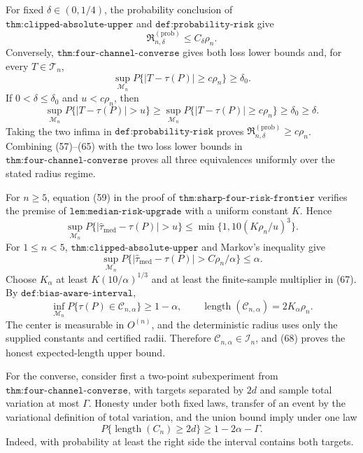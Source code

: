 For fixed \(\delta\in(0,1/4)\), the probability conclusion of \(\texttt{thm:clipped-absolute-upper}\) and \(\texttt{def:probability-risk}\) give
\[
\mathfrak R_{n,\delta}^{(\mathrm{prob})}\leq C_\delta\rho_n.           \tag{63}
\]
Conversely, \(\texttt{thm:four-channel-converse}\) gives both loss lower bounds and, for every \(T\in\mathcal T_n\),
\[
\sup_{\mathcal M_n}P\{|T-\tau(P)|\geq c\rho_n\}\geq\delta_0.         \tag{64}
\]
If \(0<\delta\leq\delta_0\) and \(u<c\rho_n\), then
\[
\sup_{\mathcal M_n}P\{|T-\tau(P)|>u\}
\geq\sup_{\mathcal M_n}P\{|T-\tau(P)|\geq c\rho_n\}
\geq\delta_0\geq\delta.                                                 \tag{65}
\]
Taking the two infima in \(\texttt{def:probability-risk}\) proves \(\mathfrak R_{n,\delta}^{(\mathrm{prob})}\geq c\rho_n\).  Combining (57)--(65) with the two loss lower bounds in \(\texttt{thm:four-channel-converse}\) proves all three equivalences uniformly over the stated radius regime.

For \(n\geq5\), equation (59) in the proof of \(\texttt{thm:sharp-four-risk-frontier}\) verifies the premise of \(\texttt{lem:median-risk-upgrade}\) with a uniform constant \(K\).  Hence
\[
\sup_{\mathcal M_n}P\{|\widehat\tau_{\mathrm{med}}-\tau(P)|>u\}
\leq\min\{1,10(K\rho_n/u)^3\}.                                         \tag{66}
\]
For \(1\leq n<5\), \(\texttt{thm:clipped-absolute-upper}\) and Markov's inequality give
\[
\sup_{\mathcal M_n}P\{|\widehat\tau_{\mathrm{med}}-\tau(P)|
>C\rho_n/\alpha\}\leq\alpha.                                          \tag{67}
\]
Choose \(K_\alpha\) at least \(K(10/\alpha)^{1/3}\) and at least the finite-sample multiplier in (67).  By \(\texttt{def:bias-aware-interval}\),
\[
\inf_{\mathcal M_n}P\{\tau(P)\in\mathcal C_{n,\alpha}\}\geq1-\alpha,
\qquad
\operatorname{length}(\mathcal C_{n,\alpha})=2K_\alpha\rho_n.          \tag{68}
\]
The center is measurable in \(O^{(n)}\), and the deterministic radius uses only the supplied constants and certified radii.  Therefore \(\mathcal C_{n,\alpha}\in\mathcal I_n\), and (68) proves the honest expected-length upper bound.

For the converse, consider first a two-point subexperiment from \(\texttt{thm:four-channel-converse}\), with targets separated by \(2d\) and sample total variation at most \(\Gamma\).  Honesty under both fixed laws, transfer of an event by the variational definition of total variation, and the union bound imply under one law
\[
P\{\operatorname{length}(C_n)\geq2d\}\geq1-2\alpha-\Gamma.             \tag{69}
\]
Indeed, with probability at least the right side the interval contains both targets.


